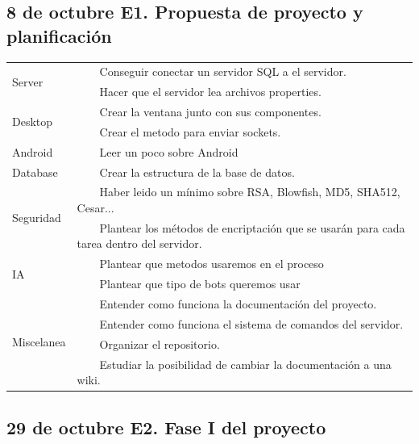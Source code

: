 \documentclass{article}
\newcommand{\tabitem}{~~\llap{\textbullet}~~}
\theoremstyle{definition}
\begin{document}
\subsection{8 de octubre	E1. Propuesta de proyecto y planificación }

\begin{tabular}{|p{3cm}|p{11cm}|}
\hline
\multirow{2}{*}{Server} & \tabitem Conseguir conectar un servidor SQL a el servidor.\\
& \tabitem Hacer que el servidor lea archivos properties.\\
\hline
\multirow{2}{*}{Desktop} & \tabitem Crear la ventana junto con sus componentes.\\
& \tabitem Crear el metodo para enviar sockets. \\
\hline  
 Android & \tabitem Leer un poco sobre Android \\
\hline 
 Database & \tabitem  Crear la estructura de la base de datos. \\
 \hline 
 \multirow{2}{*}{Seguridad} & \tabitem Haber leido un mínimo sobre RSA, Blowfish, MD5, SHA512, Cesar... \\
 & \tabitem Plantear los métodos de encriptación que se usarán para cada tarea dentro del servidor.\\
 \hline 
 \multirow{2}{*}{IA} & \tabitem Plantear que metodos usaremos en el proceso \\
 &  \tabitem Plantear que tipo de bots queremos usar\\
 \hline 
 \multirow{4}{*}{Miscelanea} & \tabitem  Entender como funciona la documentación del proyecto. \\
 & \tabitem Entender como funciona el sistema de comandos del servidor. \\
 & \tabitem Organizar el repositorio.\\
 & \tabitem Estudiar la posibilidad de cambiar la documentación a una wiki.\\
\hline
\end{tabular}



\subsection{29 de octubre	E2. Fase I del proyecto}
\end{document}
